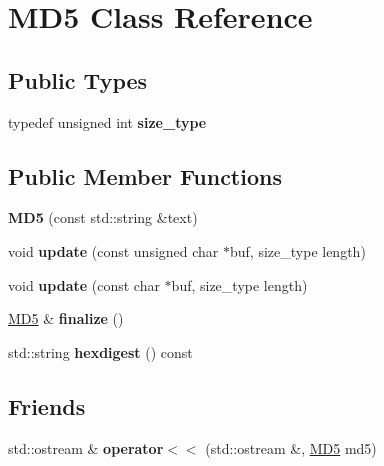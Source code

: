 \hypertarget{classMD5}{\section{M\-D5 Class Reference}
\label{classMD5}
}
\subsection*{Public Types}
\begin{DoxyCompactItemize}
\item 
\hypertarget{classMD5_aa836972700679dbcff6ae8337f6db464}{typedef unsigned int {\bfseries size\-\_\-type}}\label{classMD5_aa836972700679dbcff6ae8337f6db464}

\end{DoxyCompactItemize}
\subsection*{Public Member Functions}
\begin{DoxyCompactItemize}
\item 
\hypertarget{classMD5_a155356ffd713345e69e6dcbd9f8da6ce}{{\bfseries M\-D5} (const std\-::string \&text)}\label{classMD5_a155356ffd713345e69e6dcbd9f8da6ce}

\item 
\hypertarget{classMD5_ac5ddf6cd8f940422396d321ea90ed045}{void {\bfseries update} (const unsigned char $\ast$buf, size\-\_\-type length)}\label{classMD5_ac5ddf6cd8f940422396d321ea90ed045}

\item 
\hypertarget{classMD5_ac5ccba375539b993958fb235f8ac849c}{void {\bfseries update} (const char $\ast$buf, size\-\_\-type length)}\label{classMD5_ac5ccba375539b993958fb235f8ac849c}

\item 
\hypertarget{classMD5_a10f607494a3f2e3e515fc4b99d1a06cc}{\hyperlink{classMD5}{M\-D5} \& {\bfseries finalize} ()}\label{classMD5_a10f607494a3f2e3e515fc4b99d1a06cc}

\item 
\hypertarget{classMD5_ad36c65acf87e397bf717bc3defbc0c7a}{std\-::string {\bfseries hexdigest} () const }\label{classMD5_ad36c65acf87e397bf717bc3defbc0c7a}

\end{DoxyCompactItemize}
\subsection*{Friends}
\begin{DoxyCompactItemize}
\item 
\hypertarget{classMD5_a0739666fd0f3a7117546f6c50e0783b2}{std\-::ostream \& {\bfseries operator$<$$<$} (std\-::ostream \&, \hyperlink{classMD5}{M\-D5} md5)}\label{classMD5_a0739666fd0f3a7117546f6c50e0783b2}

\end{DoxyCompactItemize}



